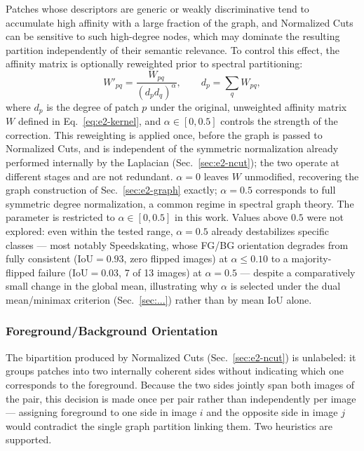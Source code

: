 Patches whose descriptors are generic or weakly discriminative tend to accumulate high affinity with a large fraction of the graph, and Normalized Cuts can be sensitive to such high-degree nodes, which may dominate the resulting partition independently of their semantic relevance. To control this effect, the affinity matrix is optionally reweighted prior to spectral partitioning:
\begin{equation}
    W'_{pq} = \frac{W_{pq}}{(d_p d_q)^{\alpha}}, \qquad d_p = \sum_q W_{pq},
    \label{eq:degree-reweight}
\end{equation}
where $d_p$ is the degree of patch $p$ under the original, unweighted affinity matrix $W$ defined in Eq.~\ref{eq:e2-kernel}, and $\alpha \in [0, 0.5]$ controls the strength of the correction. This reweighting is applied once, before the graph is passed to Normalized Cuts, and is independent of the symmetric normalization already performed internally by the Laplacian (Sec.~\ref{sec:e2-ncut}); the two operate at different stages and are not redundant. $\alpha=0$ leaves $W$ unmodified, recovering the graph construction of Sec.~\ref{sec:e2-graph} exactly; $\alpha=0.5$ corresponds to full symmetric degree normalization, a common regime in spectral graph theory. The parameter is restricted to $\alpha \in [0, 0.5]$ in this work. Values above $0.5$ were not explored: even within the tested range, $\alpha=0.5$ already destabilizes specific classes — most notably Speedskating, whose FG/BG orientation degrades from fully consistent ($\mathrm{IoU}=0.93$, zero flipped images) at $\alpha \le 0.10$ to a majority-flipped failure ($\mathrm{IoU}=0.03$, 7 of 13 images) at $\alpha=0.5$ — despite a comparatively small change in the global mean, illustrating why $\alpha$ is selected under the dual mean/minimax criterion (Sec.~\ref{sec:...}) rather than by mean IoU alone.

\subsubsection{Foreground/Background Orientation}
\label{sec:e2-orientation}

The bipartition produced by Normalized Cuts (Sec.~\ref{sec:e2-ncut}) is unlabeled: it groups patches into two internally coherent sides without indicating which one corresponds to the foreground. Because the two sides jointly span both images of the pair, this decision is made once per pair rather than independently per image — assigning foreground to one side in image $i$ and the opposite side in image $j$ would contradict the single graph partition linking them. Two heuristics are supported.

